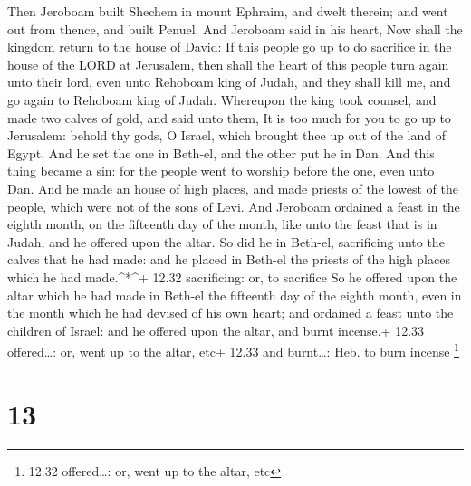  Then Jeroboam built Shechem in mount Ephraim, and dwelt
therein; and went out from thence, and built Penuel.  And
Jeroboam said in his heart, Now shall the kingdom return to the house of
David:  If this people go up to do sacrifice in the house
of the LORD at Jerusalem, then shall the heart of this people turn again
unto their lord, even unto Rehoboam king of Judah, and they shall kill
me, and go again to Rehoboam king of Judah.  Whereupon the
king took counsel, and made two calves of gold, and said unto them, It
is too much for you to go up to Jerusalem: behold thy gods, O Israel,
which brought thee up out of the land of Egypt.  And he set
the one in Beth-el, and the other put he in Dan.  And this
thing became a sin: for the people went to worship before the one, even
unto Dan.  And he made an house of high places, and made
priests of the lowest of the people, which were not of the sons of Levi.
 And Jeroboam ordained a feast in the eighth month, on the
fifteenth day of the month, like unto the feast that is in Judah, and he
offered upon the altar. So did he in Beth-el, sacrificing unto the
calves that he had made: and he placed in Beth-el the priests of the
high places which he had made.\^{}*\^{}+ 12.32 sacrificing: or, to
sacrifice  So he offered upon the altar which he had made
in Beth-el the fifteenth day of the eighth month, even in the month
which he had devised of his own heart; and ordained a feast unto the
children of Israel: and he offered upon the altar, and burnt incense.+
12.33 offered\ldots: or, went up to the altar, etc+ 12.33 and
burnt\ldots: Heb. to burn incense \footnote{12.32 offered\ldots: or,
  went up to the altar, etc}

\hypertarget{section-12}{%
\section{13}\label{section-12}}


